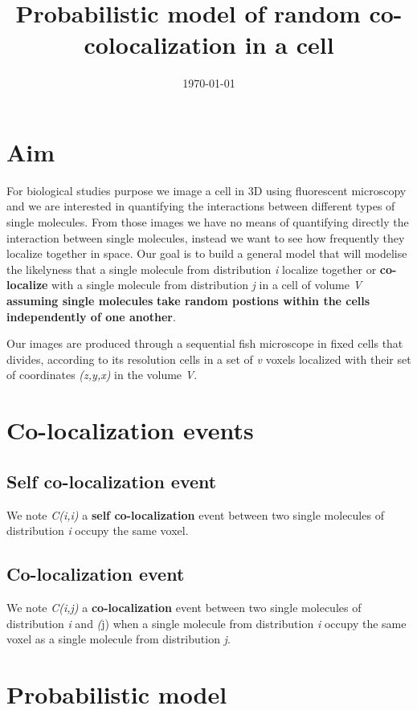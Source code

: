 \documentclass{article}
\title{Probabilistic model of random co-colocalization in a cell}
\author{}
\date{\today}
\begin{document}
\maketitle

\section{Aim}
For biological studies purpose we image a cell in 3D using fluorescent microscopy and we are interested in quantifying the 
interactions between different types of single molecules. From those images we have no means of quantifying directly the interaction
between single molecules, instead we want to see how frequently they localize together in space. Our goal is to build a general model
that will modelise the likelyness that a single molecule from distribution \textit{i} localize together or \textbf{co-localize} with
a single molecule from distribution \textit{j} in a cell of volume \textit{V} \textbf{assuming single molecules} 
\textbf{take random postions within the cells independently of one another}.

Our images are produced through a sequential fish microscope in fixed cells that divides, according to its resolution cells in a set of
\textit{v} voxels localized with their set of coordinates \textit{(z,y,x)} in the volume \textit{V}. 

\section{Co-localization events}
\subsection{Self co-localization event}
We note \textit{C(i,i)} a \textbf{self co-localization} event between two single molecules of distribution \textit{i} occupy the same
voxel.

\subsection{Co-localization event}
We note \textit{C(i,j)} a \textbf{co-localization} event between two single molecules of distribution \textit{i} and \textit(j)
when a single molecule from distribution \textit{i} occupy the same voxel as a single molecule from distribution \textit{j}.

\newpage
\section{Probabilistic model}
\end{document}
